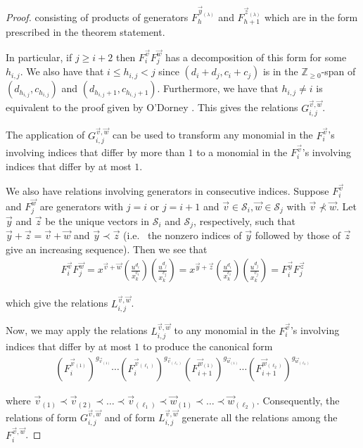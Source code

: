 \documentclass{amsart}
\theoremstyle{plain}
\theoremstyle{definition}
\theoremstyle{remark}
\numberwithin{equation}{section}
\newcommand\bz{{\mathbb Z}}
\newcommand\mss{\mathscr{S}}
\begin{document}
\begin{proof}
\noindent
consisting of products of generators $F_h^{\vec{y}_{(\lambda)}}$
and $F_{h + 1}^{\vec{z}_{(\lambda)}}$ which are in the form
prescribed in the theorem statement.

In particular, if $j \geq i + 2$ then $F_i^{\vec{v}} F_j^{\vec{w}}$
has a decomposition of this form for some $h_{i, j}$. We also have
that $i \leq h_{i, j} < j$ since $(d_i + d_j, c_i + c_j)$ is in the
$\bz_{\geq 0}$-span of $(d_{h_{i, j}}, c_{h_{i, j}})$ and
$(d_{h_{i, j} + 1}, c_{h_{i, j} + 1})$. Furthermore, we have that
$h_{i, j} \neq i$ is equivalent to the proof given by O'Dorney
\cite[Theorem 6]{dorney:canonical}. This gives the relations
$G_{i, j}^{\vec{v}, \vec{w}}$.

The application of $G_{i, j}^{\vec{v}, \vec{w}}$ can be used
to transform any monomial in the $F_i^{\vec{v}}$'s involving
indices that differ by more than $1$ to a monomial in the $F_i
^{\vec{v}}$'s involving indices that differ by at most $1$.

We also have relations involving generators in consecutive
indices. Suppose $F_i^{\vec{v}}$ and $F_j^{\vec{w}}$ are
generators with $j = i$ or $j = i + 1$ and $\vec{v} \in
\mss_i, \vec{w} \in \mss_j$ with $\vec{v} \not\prec \vec{w}$.
Let $\vec{y}$ and $\vec{z}$ be the unique vectors in $\mss_i$ and
$\mss_j$, respectively, such that $\vec{y} + \vec{z} = \vec{v} +
\vec{w}$ and $\vec{y} \prec \vec{z}$ (i.e.~ the nonzero indices
of $\vec{y}$ followed by those of $\vec{z}$ give an increasing
sequence). Then we see that
\begin{align*}
	F_i^{\vec{v}} F_j^{\vec{w}} = x^{\vec{v} + \vec{w}}
																 \left(\frac{u^{d_i}}{x_k^{c_i}}\right)
																 \left(\frac{u^{d_j}}{x_k^{c_j}}\right)
															= x^{\vec{y} + \vec{z}}
																 \left(\frac{u^{d_i}}{x_k^{c_i}}\right)
																 \left(\frac{u^{d_j}}{x_k^{c_j}}\right)
															= F_i^{\vec{y}} F_j^{\vec{z}}
\end{align*}

\noindent 
which give the relations $L_{i, j}^{\vec{v}, \vec{w}}$.

Now, we may apply the relations $L_{i, j}^{\vec{v}, \vec{w}}$
to any monomial in the $F_i^{\vec{v}}$'s involving
indices that differ by at most $1$ to produce the canonical form
\begin{align*}
	(F_i^{\vec{v}_{(1)}})^{g_{\vec{v}_{(1)}}} \cdots
	(F_i^{\vec{v}_{(\ell_1)}})^{g_{\vec{v}_{(\ell_1)}}}
	(F_{i + 1}^{\vec{w}_{(1)}})^{g_{\vec{w}_{(1)}}} \cdots
	(F_{i + 1}^{\vec{w}_{(\ell_2)}})^{g_{\vec{w}_{(\ell_2)}}}
\end{align*}

\noindent
where $\vec{v}_{(1)} \prec \vec{v}_{(2)} \prec \ldots \prec
\vec{v}_{(\ell_1)} \prec \vec{w}_{(1)} \prec \ldots \prec
\vec{w}_{(\ell_2)}$. Consequently, the relations of form
$G_{i, j}^{\vec{v}, \vec{w}}$ and of form $L_{i, j}^{\vec{v},
\vec{w}}$ generate all the relations among the $F_{i}^{\vec{v},
\vec{w}}$.
\end{proof}
\end{document}
